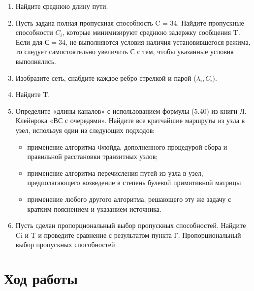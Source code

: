 \documentclass[14pt,a4paper,report]{report}
\begin{document}
\begin{enumerate}
    \item Найдите среднюю длину пути.
        \item Пусть задана полная пропускная способность C = 34. Найдите пропускные способности {$C_i$}, которые минимизируют среднюю задержку сообщения T. Если для $С=34$, не выполняются условия наличия установившегося режима, то следует самостоятельно увеличить С с тем, чтобы указанные условия выполнялись.
            \item 	Изобразите сеть, снабдите каждое ребро стрелкой и парой ($\lambda_i,C_i$).

                \item 	Найдите T.

                    \item Определите «длины каналов» с использованием формулы (5.40) из книги Л. Клейнрока «ВС с очередями». Найдите все кратчайшие маршруты из узла в узел, используя один из следующих подходов:
                    
                    \begin{itemize}
    \item 	применение алгоритма Флойда, дополненного процедурой сбора и правильной расстановки транзитных узлов;

        \item 	применение алгоритма перечисления путей из узла в узел, предполагающего возведение в степень булевой примитивной матрицы

            \item 	применение любого другого алгоритма, решающего эту же задачу с кратким пояснением и указанием источника.

\end{itemize}
                    
                    
                    
                        \item 	Пусть сделан пропорциональный выбор пропускных способностей. Найдите {Ci} и T и проведите сравнение с результатом пункта Г. Пропорциональный выбор пропускных способностей 

\end{enumerate}





\clearpage


\section{Ход работы}
\end{document}
